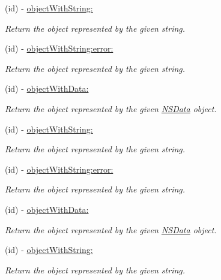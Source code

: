 \begin{DoxyCompactItemize}
(id) -\/ \hyperlink{interface_s_b_json_parser_a1ec40b986576044d58d30172b141c74c}{object\-With\-String\-:}
\begin{DoxyCompactList}\small\item\em \-Return the object represented by the given string. \end{DoxyCompactList}\item 
(id) -\/ \hyperlink{interface_s_b_json_parser_a7a7fff47f41a08fa0defc4f628846e15}{object\-With\-String\-:error\-:}
\begin{DoxyCompactList}\small\item\em \-Return the object represented by the given string. \end{DoxyCompactList}\item 
(id) -\/ \hyperlink{interface_s_b_json_parser_a66d7be591cdf0d9ee85c21c863ef5cbf}{object\-With\-Data\-:}
\begin{DoxyCompactList}\small\item\em \-Return the object represented by the given \hyperlink{class_n_s_data}{\-N\-S\-Data} object. \end{DoxyCompactList}\item 
(id) -\/ \hyperlink{interface_s_b_json_parser_a1ec40b986576044d58d30172b141c74c}{object\-With\-String\-:}
\begin{DoxyCompactList}\small\item\em \-Return the object represented by the given string. \end{DoxyCompactList}\item 
(id) -\/ \hyperlink{interface_s_b_json_parser_a7a7fff47f41a08fa0defc4f628846e15}{object\-With\-String\-:error\-:}
\begin{DoxyCompactList}\small\item\em \-Return the object represented by the given string. \end{DoxyCompactList}\item 
(id) -\/ \hyperlink{interface_s_b_json_parser_a66d7be591cdf0d9ee85c21c863ef5cbf}{object\-With\-Data\-:}
\begin{DoxyCompactList}\small\item\em \-Return the object represented by the given \hyperlink{class_n_s_data}{\-N\-S\-Data} object. \end{DoxyCompactList}\item 
(id) -\/ \hyperlink{interface_s_b_json_parser_a1ec40b986576044d58d30172b141c74c}{object\-With\-String\-:}
\begin{DoxyCompactList}\small\item\em \-Return the object represented by the given string. \end{DoxyCompactList}\item 

\end{DoxyCompactItemize}
